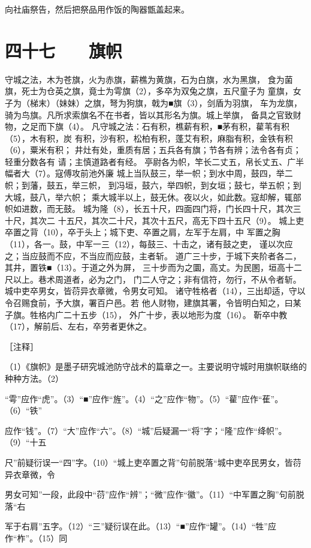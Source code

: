 \documentclass[12pt,UTF8]{ctexbook}
\begin{document}
向社庙祭告，然后把祭品用作饭的陶器甑盖起来。 

\chapter{四十七　　旗帜}

守城之法，木为苍旗，火为赤旗，薪樵为黄旗，石为白旗，水为黑旗， 
食为菌旗，死士为仓英之旗，竟士为雩旗（2），多卒为双兔之旗，五尺童子为 
童旗，女子为（梯末）（妹妹）之旗，弩为狗旗，戟为■旗（3），剑盾为羽旗， 
车为龙旗，骑为鸟旗。凡所求索旗名不在书者，皆以其形名为旗。城上举旗， 
备具之官致财物，之足而下旗（4）。 
凡守城之法：石有积，樵薪有积，■茅有积，雚苇有积（5），木有积，炭 
有积，沙有积，松柏有积，蓬艾有积，麻脂有积，金铁有积（6），粟米有积； 
井灶有处，重质有居；五兵各有旗；节各有辨；法令各有贞；轻重分数各有 
请；主慎道路者有经。 
亭尉各为帜，竿长二丈五，帛长丈五、广半幅者大（7）。寇傅攻前池外廉 
城上当队鼓三，举一帜；到水中周，鼓四，举二帜；到藩，鼓五，举三帜， 
到冯垣，鼓六，举四帜，到女垣；鼓七，举五帜；到大城，鼓八，举六帜； 
乘大城半以上，鼓无休。夜以火，如此数。寇却解，辄部帜如进数，而无鼓。 
城为隆（8），长五十尺，四面四门将，门长四十尺，其次三十尺，其次二 
十五尺，其次二十尺，其次十五尺，高无下四十五尺（9）。 
城上吏卒置之背（10），卒于头上；城下吏、卒置之肩，左军于左肩，中 
军置之胸（11），各一。鼓，中军一三（12），每鼓三、十击之，诸有鼓之吏， 
谨以次应之；当应鼓而不应，不当应而应鼓，主者斩。 
道广三十步，于城下夹阶者各二，其井，置铁■（13）。于道之外为屏， 
三十步而为之圜，高丈。为民圂，垣高十二尺以上。巷术周道者，必为之门， 
门二人守之；非有信符，勿行，不从令者斩。 
城中吏卒男女，皆葕异衣章微，令男女可知。 
诸守牲格者（14），三出却适，守以令召赐食前，予大旗，署百户邑。若 
他人财物，建旗其署，令皆明白知之，曰某子旗。牲格内广二十五步（15）， 
外广十步，表以地形为度（16）。 
靳卒中教（17），解前后、左右，卒劳者更休之。 


［注释］ 

（1）《旗帜》是墨子研究城池防守战术的篇章之一。主要说明守城时用旗帜联络的种种方法。（2） 

“雩”应作“虎”。（3）“■”应作“旌”。（4）“之”应作“物”。（5）“雚”应作“萑”。（6）“铁” 

应作“钱”。（7）“大”应作“六”。（8）“城”后疑漏一“将”字；“隆”应作“绛帜”。（9）“十五 

尺”前疑衍误一“四”字。（10）“城上吏卒置之背”句前脱落“城中吏卒民男女，皆葕异衣章微，令 

男女可知”一段，此段中“葕”应作“辨”；“微”应作“徽”。（11）“中军置之胸”句前脱落“右 

军于右肩”五字。（12）“三”疑衍误在此。（13）“■”应作“罐”。（14）“牲”应作“柞”。（15）同 
\end{document}
